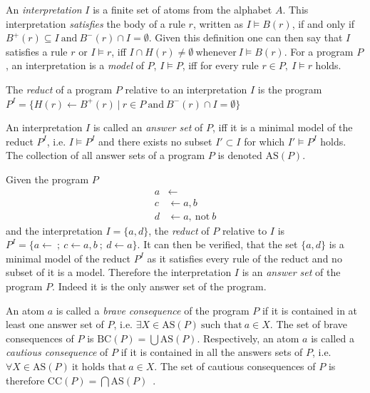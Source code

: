 An \emph{interpretation} $I$ is a finite set of atoms from the alphabet $A$. This interpretation \emph{satisfies} the body of a rule $r$, written as \(I \models B(r)\), if and only if \(B^+(r) \subseteq I\ \text{and}\ B^-(r) \cap I = \emptyset\). Given this definition one can then say that $I$ satisfies a rule $r$ or \(I \models r\), iff \(I \cap H(r) \neq \emptyset \ \text{whenever}\ I \models B(r)\). For a program $P$, an interpretation is a \emph{model} of $P$, \(I \models P\), iff for every rule \(r \in P,\ I \models r\) holds.
\begin{definition}
\label{def:reduct}
    The \emph{reduct} of a program $P$ relative to an interpretation $I$ is the program \(P^I = \{ H(r) \leftarrow B^+(r) \ | \ r \in P \ \text{and} \ B^-(r) \cap I = \emptyset\}\) \cite{GL88}
\end{definition}
An interpretation $I$ is called an \emph{answer set} of $P$, iff it is a minimal model of the reduct \(P^I\), i.e. \(I \models P^I \) and there exists no subset \( I' \subset I \) for which \( I' \models P^{I}\) holds. The collection of all answer sets of a program $P$ is denoted \(\text{AS}(P)\).
\begin{example}
\label{ex:reduct}
    Given the program $P$
    \begin{align*}
        a &\leftarrow \\
        c &\leftarrow a, b \\
        d &\leftarrow a,\ \text{not}\ b
    \end{align*}
    and the interpretation \(I = \{a, d\}\), the \emph{reduct} of $P$ relative to $I$ is \(P^I = \{a \leftarrow\ ;\ c \leftarrow a, b\ ;\ d \leftarrow a\}\). It can then be verified, that the set \(\{a,d\}\) is a minimal model of the reduct \(P^I\) as it satisfies every rule of the reduct and no subset of it is a model. Therefore the interpretation $I$ is an \emph{answer set} of the program $P$. Indeed it is the only answer set of the program.
\end{example}
An atom $a$ is called a \emph{brave consequence} of the program $P$ if it is contained in at least one answer set of $P$, i.e. \(\exists X \in \text{AS}(P) \ \text{such that}\ a \in X\). The set of brave consequences of $P$ is \(\text{BC}(P) = \bigcup \text{AS}(P)\).
Respectively, an atom $a$ is called a \emph{cautious consequence} of $P$ if it is contained in all the answers sets of $P$, i.e. \(\forall X \in \text{AS}(P) \ \text{it holds that}\ a \in X\). The set of cautious consequences of $P$ is therefore \(\text{CC}(P) = \bigcap \text{AS}(P)\)~\cite{FGR22}.

